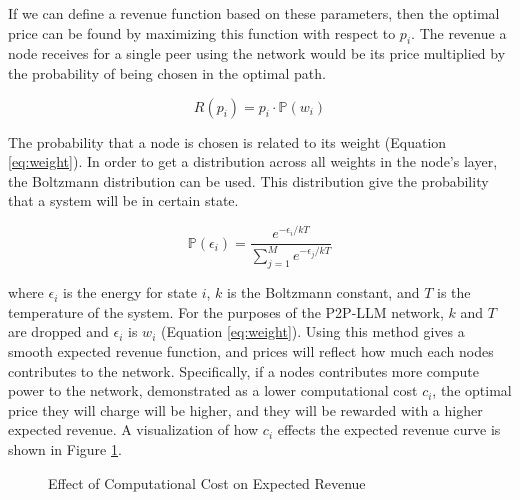 \documentclass[preprint,twoside,11pt]{article}
\begin{document}
If we can define a revenue function based on these parameters, then the optimal price can be found by maximizing this function with respect to $p_i$.
The revenue a node receives for a single peer using the network would be its price multiplied by the probability of being chosen in the optimal path.

\begin{equation}
	R(p_i) = p_i \cdot \mathbb{P}(w_i)
	\label{eq:revenue}
\end{equation}

The probability that a node is chosen is related to its weight (Equation \ref{eq:weight}).
In order to get a distribution across all weights in the node's layer, the Boltzmann distribution \citep{boltzmann1868studien} can be used.
This distribution give the probability that a system will be in certain state.

\begin{equation}
	\mathbb{P}(\epsilon_i) = \frac{e^{- \epsilon_i / kT}}{\sum_{j=1}^{M}e^{- \epsilon_j / kT}}
	\label{eq:Boltzmann}
\end{equation}

where $\epsilon_i$ is the energy for state $i$, $k$ is the Boltzmann constant, and $T$ is the temperature of the system.
For the purposes of the P2P-LLM network, $k$ and $T$ are dropped and $\epsilon_i$ is $w_i$ (Equation \ref{eq:weight}).
Using this method gives a smooth expected revenue function, and prices will reflect how much each nodes contributes to the network.
Specifically, if a nodes contributes more compute power to the network, demonstrated as a lower computational cost $c_i$, the optimal
price they will charge will be higher, and they will be rewarded with a higher expected revenue.
A visualization of how $c_i$ effects the expected revenue curve is shown in Figure \ref{fig:exp_rev}.

\begin{figure}[h]
	\centering
	\caption{Effect of Computational Cost on Expected Revenue}
	\label{fig:exp_rev}
\end{figure}
\end{document}

